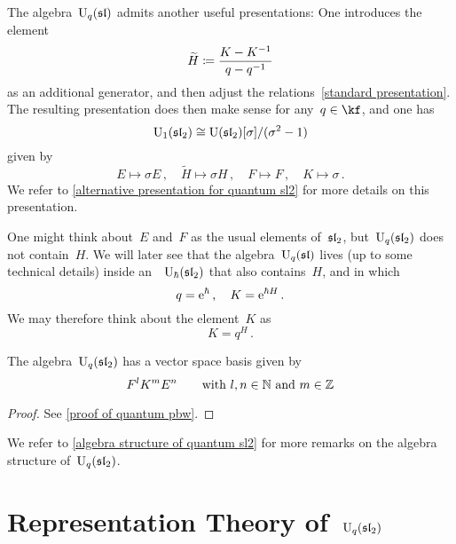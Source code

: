 \documentclass[a4paper, 11pt, oneside]{scrartcl}
\begin{document}
\begin{remark}[The case~$q = 1$]
  \label{quantum U1}
  The algebra~$\operatorname{U}_q(\mathfrak{sl})$ admits another useful presentations:
  One introduces the element
  \[
    \widetilde{H}
    \coloneqq
    \frac{K - K^{-1}}{q - q^{-1}}
  \]
  as an additional generator, and then adjust the relations~\eqref{standard presentation}.
  The resulting presentation does then make sense for any~$q \in \kf$, and one has
  \[
    \operatorname{U}_1(\mathfrak{sl}_2)
    \cong
    \operatorname{U}(\mathfrak{sl}_2)[\sigma]/(\sigma^2 - 1)
  \]
  given by
  \begin{equation}
    \label{isomorphism for U1}
    E \mapsto \sigma E \,,
    \quad
    \widetilde{H} \mapsto \sigma H \,,
    \quad
    F \mapsto F \,,
    \quad
    K \mapsto \sigma \,.
  \end{equation}
  We refer to \cref{alternative presentation for quantum sl2} for more details on this presentation.
\end{remark}

\begin{remark}
  One might think about~$E$ and~$F$ as the usual elements of~$\mathfrak{sl}_2$, but~$\operatorname{U}_q(\mathfrak{sl}_2)$ does not contain~$H$.
  We will later see that the algebra~$\operatorname{U}_q(\mathfrak{sl})$ lives (up to some technical details) inside an~\algebra{$\kfhbar$}~$\operatorname{U}_{\hbar}(\mathfrak{sl}_2)$ that also contains~$H$, and in which
  \[
    q = \mathrm{e}^{\hbar} \,,
    \quad
    K = \mathrm{e}^{\hbar H} \,.
  \]
  We may therefore think about the element~$K$ as
  \[
    K
    =
    q^H \,.
  \]
\end{remark}

\begin{theorem}
  \label{quantum pbw}
  The algebra~$\operatorname{U}_q(\mathfrak{sl}_2)$ has a vector space basis given by
  \[
    F^l K^m E^n
    \qquad
    \text{with~$l, n \in \mathbb{N}$ and~$m \in \mathbb{Z}$} 
  \]
\end{theorem}

\begin{proof}
  See \cref{proof of quantum pbw}.
\end{proof}

We refer to \cref{algebra structure of quantum sl2} for more remarks on the algebra structure of~$\operatorname{U}_q(\mathfrak{sl}_2)$.





\section{Representation Theory of~$\operatorname{U}_q(\mathfrak{sl}_2)$}
\end{document}
